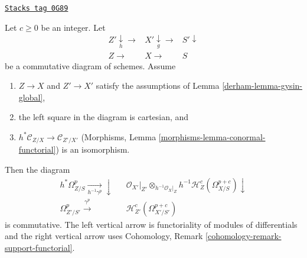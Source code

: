 \begin{lemma}
\label{derham-lemma-gysin-transverse}
\href{https://stacks.math.columbia.edu/tag/0G89}{\texttt{Stacks tag 0G89}}

Let $c \geq 0$ be an integer. Let
$$
\begin{array}{ccc}Z' \underset{h}{\downarrow}\longrightarrow & X' \underset{g}{\downarrow}\longrightarrow & S' \downarrow \\ Z \longrightarrow & X \longrightarrow & S\end{array}
$$
be a commutative diagram of schemes.
Assume
\begin{enumerate}
\item $Z \to X$ and $Z' \to X'$
satisfy the assumptions of Lemma \ref{derham-lemma-gysin-global},
\item the left square in the diagram is cartesian, and
\item $h^*\mathcal{C}_{Z/X} \to \mathcal{C}_{Z'/X'}$
(Morphisms, Lemma \ref{morphisms-lemma-conormal-functorial})
is an isomorphism.
\end{enumerate}
Then the diagram
$$
\begin{array}{ccc}h^*\Omega^p_{Z/S} \underset{h^{-1}\gamma^p}{\longrightarrow}\downarrow &  & \mathcal{O}_{X'}|_{Z'} \otimes_{h^{-1}\mathcal{O}_X|_Z}
h^{-1}\mathcal{H}^c_Z(\Omega^{p + c}_{X/S}) \downarrow \\ \Omega^p_{Z'/S'} \overset{\gamma^p}{\longrightarrow} &  & \mathcal{H}^c_{Z'}(\Omega^{p + c}_{X'/S'})\end{array}
$$
is commutative. The left vertical arrow is functoriality of modules of
differentials and the right vertical arrow uses
Cohomology, Remark \ref{cohomology-remark-support-functorial}.
\end{lemma}

